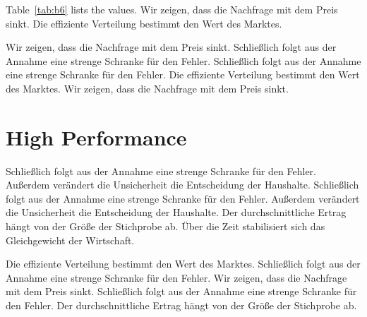 \documentclass[11pt]{article}
\begin{document}
Table~\ref{tab:b6} lists the values. Wir zeigen, dass die Nachfrage mit dem Preis sinkt. Die effiziente Verteilung bestimmt den Wert des Marktes.

Wir zeigen, dass die Nachfrage mit dem Preis sinkt. Schließlich folgt aus der Annahme eine strenge Schranke für den Fehler. Schließlich folgt aus der Annahme eine strenge Schranke für den Fehler. Die effiziente Verteilung bestimmt den Wert des Marktes. Wir zeigen, dass die Nachfrage mit dem Preis sinkt.

\section{High Performance}\label{sec:7}

Schließlich folgt aus der Annahme eine strenge Schranke für den Fehler. Außerdem verändert die Unsicherheit die Entscheidung der Haushalte. Schließlich folgt aus der Annahme eine strenge Schranke für den Fehler. Außerdem verändert die Unsicherheit die Entscheidung der Haushalte. Der durchschnittliche Ertrag hängt von der Größe der Stichprobe ab. Über die Zeit stabilisiert sich das Gleichgewicht der Wirtschaft.

Die effiziente Verteilung bestimmt den Wert des Marktes. Schließlich folgt aus der Annahme eine strenge Schranke für den Fehler. Wir zeigen, dass die Nachfrage mit dem Preis sinkt. Schließlich folgt aus der Annahme eine strenge Schranke für den Fehler. Der durchschnittliche Ertrag hängt von der Größe der Stichprobe ab.
\end{document}
